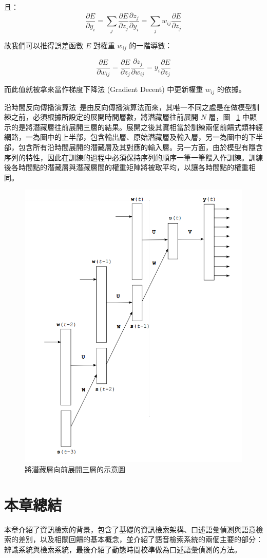 且：
\begin{equation}
\frac{\partial E}{\partial y_i} = \sum_j \frac{\partial E}{\partial z_j} \frac{\partial z_j}{\partial y_i} = \sum_j w_{ij} \frac{\partial E}{\partial z_j}
\end{equation}

故我們可以推得誤差函數 $E$ 對權重 $w_{ij}$ 的一階導數：

\begin{equation}
\frac{\partial E}{\partial w_{ij}} = \frac{\partial E}{\partial z_j} \frac{\partial z_j}{\partial w_{ij}} = y_i \frac{\partial E}{\partial z_j} 
\end{equation}

而此值就被拿來當作梯度下降法 (Gradient Decent) 中更新權重 $w_{ij}$ 的依據。

沿時間反向傳播演算法~\cite{boden2002guide}是由反向傳播演算法而來，其唯一不同之處是在做模型訓練之前，必須根據所設定的展開時間層數，將潛藏層往前展開 $N$ 層，圖 ~\ref{fig:chap5_bptt}
中顯示的是將潛藏層往前展開三層的結果。展開之後其實相當於訓練兩個前饋式類神經網路，一為圖中的上半部，包含輸出層、原始潛藏層及輸入層，另一為圖中的下半部，包含所有沿時間展開的潛藏層及其對應的輸入層。另一方面，由於模型有隱含序列的特性，因此在訓練的過程中必須保持序列的順序一筆一筆餵入作訓練。訓練後各時間點的潛藏層與潛藏層間的權重矩陣將被取平均，以讓各時間點的權重相同。

\begin{figure}
\centering
\includegraphics[scale=0.5]{images/chap5_bptt.png}
\caption{將潛藏層向前展開三層的示意圖} \label{fig:chap5_bptt}
\end{figure}

\section{本章總結}
本章介紹了資訊檢索的背景，包含了基礎的資訊檢索架構、口述語彙偵測與語意檢索的差別，以及相關回饋的基本概念，並介紹了語音檢索系統的兩個主要的部分：辨識系統與檢索系統，最後介紹了動態時間校準做為口述語彙偵測的方法。

